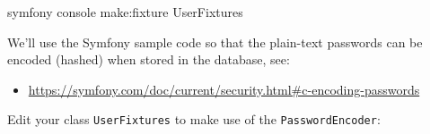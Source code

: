 \documentclass[a4paperpaper,openright]{book}
\newenvironment{Shaded}{}{}
\newcommand{\ExtensionTok}[1]{#1}
\newcommand{\NormalTok}[1]{#1}
\providecommand{\tightlist}{%
  \setlength{\itemsep}{0pt}\setlength{\parskip}{0pt}}
\begin{document}
\begin{Shaded}
\begin{Highlighting}[]
    \ExtensionTok{symfony}\NormalTok{ console make:fixture UserFixtures}
\end{Highlighting}
\end{Shaded}

We'll use the Symfony sample code so that the plain-text passwords can
be encoded (hashed) when stored in the database, see:

\begin{itemize}
\tightlist
\item
  \url{https://symfony.com/doc/current/security.html\#c-encoding-passwords}
\end{itemize}

Edit your class \texttt{UserFixtures} to make use of the
\texttt{PasswordEncoder}:
\end{document}
